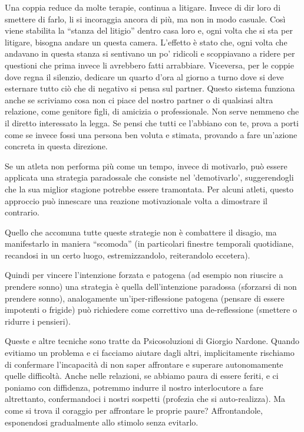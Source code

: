 \documentclass[12pt]{book} %
\begin{document}
\begin{mdframed}[linewidth=1pt]
Una coppia reduce da molte terapie, continua a litigare. Invece di dir loro di smettere di farlo, li si incoraggia
ancora di più, ma non in modo casuale. Così viene stabilita la “stanza del litigio” dentro casa loro e, ogni volta che si sta per
litigare, bisogna andare un questa camera. L'effetto è stato che, ogni volta che andavano in questa stanza si sentivano un po' ridicoli e scoppiavano a ridere per questioni che prima invece li avrebbero fatti arrabbiare. Viceversa, per le
coppie dove regna il silenzio, dedicare un quarto d'ora al giorno a turno dove si deve esternare
tutto ciò che di negativo si pensa sul partner. Questo sistema funziona anche se scriviamo cosa non ci piace del nostro
partner o di qualsiasi altra relazione, come genitore figli, di amicizia o professionale. Non serve nemmeno che il
diretto interessato la legga. Se pensi che tutti ce l'abbiano con te, prova a porti come se invece fossi una persona
ben voluta e stimata, provando a fare un'azione concreta in questa direzione. 

Se un atleta non performa più come un tempo, invece di motivarlo, può essere applicata una strategia paradossale che consiste nel 'demotivarlo', suggerendogli che la sua miglior stagione potrebbe essere tramontata. Per alcuni atleti, questo approccio può innescare una reazione motivazionale volta a dimostrare il contrario.

Quello che accomuna tutte queste strategie non è combattere il disagio, ma manifestarlo in maniera “scomoda” (in
particolari finestre temporali quotidiane, recandosi in un certo luogo, estremizzandolo, reiterandolo eccetera).

Quindi per vincere l'intenzione forzata e patogena (ad esempio non riuscire a prendere sonno) una strategia è quella dell'intenzione paradossa (sforzarsi di non prendere sonno), analogamente un'iper-riflessione patogena (pensare di essere impotenti o frigide) può richiedere come correttivo una de-reflessione (smettere o ridurre i pensieri).

Queste e altre tecniche sono tratte da Psicosoluzioni di Giorgio Nardone. 
Quando evitiamo un problema e ci facciamo aiutare dagli altri, implicitamente rischiamo di confermare l'incapacità di non saper affrontare e superare autonomamente quelle difficoltà. Anche nelle relazioni, se abbiamo paura di essere feriti, e ci poniamo con diffidenza, potremmo indurre il
nostro interlocutore a fare altrettanto, confermandoci i nostri sospetti (profezia che si auto-realizza). Ma come si
trova il coraggio per affrontare le proprie paure? Affrontandole, esponendosi gradualmente allo stimolo senza evitarlo.
\end{mdframed}
\end{document}
